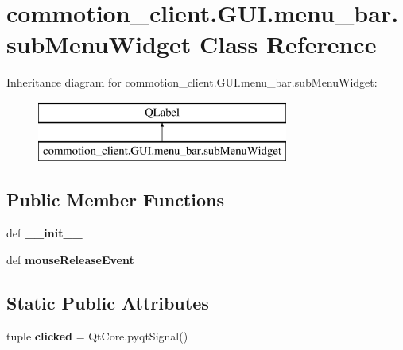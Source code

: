 \hypertarget{classcommotion__client_1_1GUI_1_1menu__bar_1_1subMenuWidget}{\section{commotion\+\_\+client.\+G\+U\+I.\+menu\+\_\+bar.\+sub\+Menu\+Widget Class Reference}
\label{classcommotion__client_1_1GUI_1_1menu__bar_1_1subMenuWidget}
}
Inheritance diagram for commotion\+\_\+client.\+G\+U\+I.\+menu\+\_\+bar.\+sub\+Menu\+Widget\+:\begin{figure}[H]
\begin{center}
\leavevmode
\includegraphics[height=2.000000cm]{classcommotion__client_1_1GUI_1_1menu__bar_1_1subMenuWidget}
\end{center}
\end{figure}
\subsection*{Public Member Functions}
\begin{DoxyCompactItemize}
\item 
\hypertarget{classcommotion__client_1_1GUI_1_1menu__bar_1_1subMenuWidget_adfb72c16f79d60a460836f368d636867}{def {\bfseries \+\_\+\+\_\+init\+\_\+\+\_\+}}\label{classcommotion__client_1_1GUI_1_1menu__bar_1_1subMenuWidget_adfb72c16f79d60a460836f368d636867}

\item 
\hypertarget{classcommotion__client_1_1GUI_1_1menu__bar_1_1subMenuWidget_a360c7df2bc1675f2eacc63ed076fba6f}{def {\bfseries mouse\+Release\+Event}}\label{classcommotion__client_1_1GUI_1_1menu__bar_1_1subMenuWidget_a360c7df2bc1675f2eacc63ed076fba6f}

\end{DoxyCompactItemize}
\subsection*{Static Public Attributes}
\begin{DoxyCompactItemize}
\item 
\hypertarget{classcommotion__client_1_1GUI_1_1menu__bar_1_1subMenuWidget_a9d362f09bf58710e2d5cc3299f20852c}{tuple {\bfseries clicked} = Qt\+Core.\+pyqt\+Signal()}\label{classcommotion__client_1_1GUI_1_1menu__bar_1_1subMenuWidget_a9d362f09bf58710e2d5cc3299f20852c}

\end{DoxyCompactItemize}


